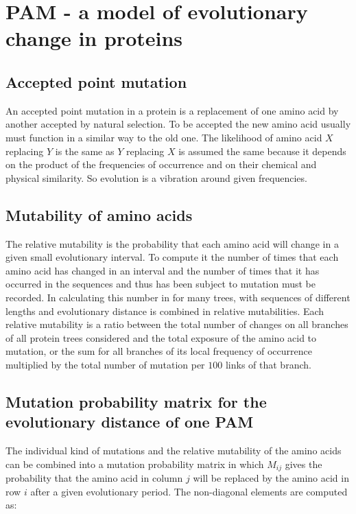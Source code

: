 \graphicspath{{chapters/03/images}}
\chapter{PAM - a model of evolutionary change in proteins}

\section{Accepted point mutation}
An accepted point mutation in a protein is a replacement of one amino acid by another accepted by natural selection.
To be accepted the new amino acid usually must function in a similar way to the old one.
The likelihood of amino acid $X$ replacing $Y$ is the same as $Y$ replacing $X$ is assumed the same because it depends on the product of the frequencies of occurrence and on their chemical and physical similarity.
So evolution is a vibration around given frequencies.

\section{Mutability of amino acids}
The relative mutability is the probability that each amino acid will change in a given small evolutionary interval.
To compute it the number of times that each amino acid has changed in an interval and the number of times that it has occurred in the sequences and thus has been subject to mutation must be recorded.
In calculating this number in for many trees, with sequences of different lengths and evolutionary distance is combined in relative mutabilities.
Each relative mutability is a ratio between the total number of changes on all branches of all protein trees considered and the total exposure of the amino acid to mutation, or the sum for all branches of its local frequency of occurrence multiplied by the total number of mutation per $100$ links of that branch.

\section{Mutation probability matrix for the evolutionary distance of one PAM}
The individual kind of mutations and the relative mutability of the amino acids can be combined into a mutation probability matrix in which $M_{ij}$ gives the probability that the amino acid in column $j$ will be replaced by the amino acid in row $i$ after a given evolutionary period.
The non-diagonal elements are computed as:

